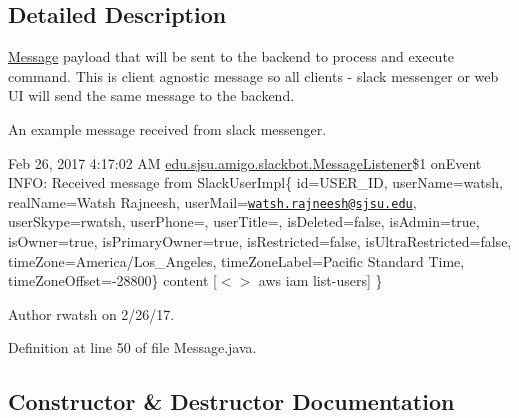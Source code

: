 \subsection{Detailed Description}
\hyperlink{classedu_1_1sjsu_1_1amigo_1_1mp_1_1kafka_1_1_message}{Message} payload that will be sent to the backend to process and execute command. This is client agnostic message so all clients -\/ slack messenger or web UI will send the same message to the backend.

An example message received from slack messenger.

Feb 26, 2017 4\+:17\+:02 AM \hyperlink{classedu_1_1sjsu_1_1amigo_1_1slackbot_1_1_message_listener}{edu.\+sjsu.\+amigo.\+slackbot.\+Message\+Listener}\$1 on\+Event I\+N\+FO\+: Received message from Slack\+User\+Impl\{ id=\textquotesingle{}U\+S\+E\+R\+\_\+\+ID\textquotesingle{}, user\+Name=\textquotesingle{}watsh\textquotesingle{}, real\+Name=\textquotesingle{}Watsh Rajneesh\textquotesingle{}, user\+Mail=\textquotesingle{}\href{mailto:watsh.rajneesh@sjsu.edu}{\tt watsh.\+rajneesh@sjsu.\+edu}\textquotesingle{}, user\+Skype=\textquotesingle{}rwatsh\textquotesingle{}, user\+Phone=\textquotesingle{}\textquotesingle{}, user\+Title=\textquotesingle{}\textquotesingle{}, is\+Deleted=false\textquotesingle{}, is\+Admin=true\textquotesingle{}, is\+Owner=true\textquotesingle{}, is\+Primary\+Owner=true\textquotesingle{}, is\+Restricted=false\textquotesingle{}, is\+Ultra\+Restricted=false, time\+Zone=America/\+Los\+\_\+\+Angeles, time\+Zone\+Label=Pacific Standard Time, time\+Zone\+Offset=-\/28800\} content \mbox{[}$<$$>$ aws iam list-\/users\mbox{]} \}

\begin{DoxyAuthor}{Author}
rwatsh on 2/26/17. 
\end{DoxyAuthor}


Definition at line 50 of file Message.\+java.



\subsection{Constructor \& Destructor Documentation}
\mbox{\label{classedu_1_1sjsu_1_1amigo_1_1mp_1_1kafka_1_1_message_ad82e52562c76f636a7fed853011bfb58}} 
